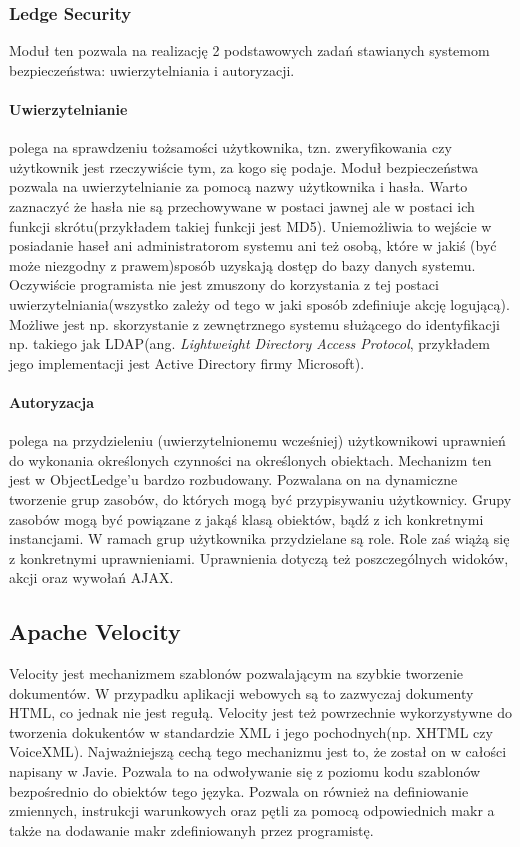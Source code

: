 \subsubsection{Ledge Security}
Moduł ten pozwala na realizację 2 podstawowych zadań stawianych systemom bezpieczeństwa: uwierzytelniania i autoryzacji.

\paragraph{Uwierzytelnianie} polega na sprawdzeniu tożsamości użytkownika, tzn. zweryfikowania czy użytkownik jest rzeczywiście tym, za kogo się podaje. Moduł bezpieczeństwa pozwala na uwierzytelnianie za pomocą nazwy użytkownika i hasła. Warto zaznaczyć że hasła nie są przechowywane w postaci jawnej ale w postaci ich funkcji skrótu(przykładem takiej funkcji jest MD5). Uniemożliwia to wejście w posiadanie haseł ani administratorom systemu ani też osobą, które w jakiś (być może niezgodny z prawem)sposób uzyskają dostęp do bazy danych systemu. Oczywiście programista nie jest zmuszony do korzystania z tej postaci uwierzytelniania(wszystko zależy od tego w jaki sposób zdefiniuje akcję logującą). Możliwe jest np. skorzystanie z zewnętrznego systemu służącego do identyfikacji np. takiego jak LDAP(ang. \textit{Lightweight Directory Access Protocol}, przykładem jego implementacji jest Active Directory firmy Microsoft).

\paragraph{Autoryzacja} polega na przydzieleniu (uwierzytelnionemu wcześniej) użytkownikowi uprawnień do wykonania określonych czynności na określonych obiektach. Mechanizm ten jest w ObjectLedge'u bardzo rozbudowany. Pozwalana on na dynamiczne tworzenie grup zasobów, do których mogą być przypisywaniu użytkownicy. Grupy zasobów mogą być powiązane z jakąś klasą obiektów, bądź z ich konkretnymi instancjami. W ramach grup użytkownika przydzielane są role. Role zaś wiążą się z konkretnymi uprawnieniami. Uprawnienia dotyczą też poszczególnych widoków, akcji oraz wywołań AJAX.

\subsection[Apache Velocity][Apache Velocity]{Apache Velocity}
Velocity jest mechanizmem szablonów pozwalającym na szybkie tworzenie dokumentów. W przypadku aplikacji webowych są to zazwyczaj dokumenty HTML, co jednak nie jest regułą. Velocity jest też powrzechnie wykorzystywne do tworzenia dokukentów w standardzie XML i jego pochodnych(np. XHTML czy VoiceXML). Najważniejszą cechą tego mechanizmu jest to, że został on w całości napisany w Javie. Pozwala to na odwoływanie się z poziomu kodu szablonów bezpośrednio do obiektów tego języka. Pozwala on również na definiowanie zmiennych, instrukcji warunkowych oraz pętli za pomocą odpowiednich makr a także na dodawanie makr zdefiniowanyh przez programistę.

